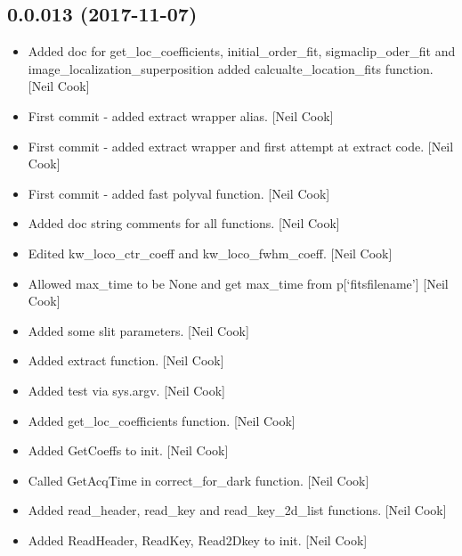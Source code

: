 \documentclass[a4paper,10pt,english]{report}
\begin{document}
\subsection{0.0.013 (2017-11-07)}
\label{\detokenize{misc/changelog:id536}}\begin{itemize}
\item {} 
Added doc for get\_loc\_coefficients, initial\_order\_fit,
sigmaclip\_oder\_fit and image\_localization\_superposition added
calcualte\_location\_fits function. {[}Neil Cook{]}

\item {} 
First commit - added extract wrapper alias. {[}Neil Cook{]}

\item {} 
First commit - added extract wrapper and first attempt at extract
code. {[}Neil Cook{]}

\item {} 
First commit - added fast polyval function. {[}Neil Cook{]}

\item {} 
Added doc string comments for all functions. {[}Neil Cook{]}

\item {} 
Edited kw\_loco\_ctr\_coeff and kw\_loco\_fwhm\_coeff. {[}Neil Cook{]}

\item {} 
Allowed max\_time to be None and get max\_time from p{[}‘fitsfilename’{]}
{[}Neil Cook{]}

\item {} 
Added some slit parameters. {[}Neil Cook{]}

\item {} 
Added extract function. {[}Neil Cook{]}

\item {} 
Added test via sys.argv. {[}Neil Cook{]}

\item {} 
Added get\_loc\_coefficients function. {[}Neil Cook{]}

\item {} 
Added GetCoeffs to init. {[}Neil Cook{]}

\item {} 
Called GetAcqTime in correct\_for\_dark function. {[}Neil Cook{]}

\item {} 
Added read\_header, read\_key and read\_key\_2d\_list functions. {[}Neil
Cook{]}

\item {} 
Added ReadHeader, ReadKey, Read2Dkey to init. {[}Neil Cook{]}


\end{itemize}
\end{document}

